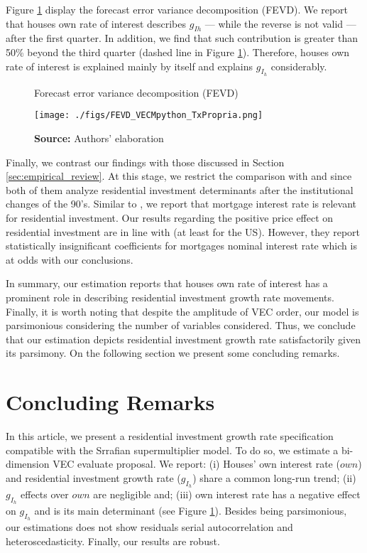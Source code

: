 \documentclass[12pt, a4paper]{article}
\begin{document}
Figure \ref{fevd} display the forecast error variance decomposition (FEVD).
We report that houses own rate of interest describes \(g_{Ih}\) --- while the reverse is not valid --- after the first quarter.
In addition, we find that such contribution is greater than 50\% beyond the third quarter (dashed line in Figure \ref{fevd}).
Therefore, houses own rate of interest is explained mainly by itself and explains \(g_{I_h}\) considerably.

\begin{figure}[H]
	\centering
	\caption{Forecast error variance decomposition (FEVD)}
	\label{fevd}
	\texttt{[image: ./figs/FEVD\_VECMpython\_TxPropria.png]}
	\caption*{\textbf{Source:} Authors' elaboration}
\end{figure}


Finally,  we contrast our findings with those discussed in Section \ref{sec:empirical_review}.
At this stage, we restrict the comparison with  \textcite{gauger_residential_2003} and \textcite{arestis_residential_2015} since both of them analyze residential investment determinants after the institutional changes of the 90's.
Similar to \textcite{gauger_residential_2003}, we report that mortgage interest rate is relevant for residential investment.
Our results regarding the positive price effect on residential investment are in line with \textcite{arestis_residential_2015} (at least for the US).
However, they report statistically insignificant coefficients for mortgages nominal interest rate which is at odds with our conclusions.

In summary, our estimation reports that houses own rate of interest has a prominent role in describing residential investment growth rate movements.
Finally, it is worth noting that despite the amplitude of VEC order, our model is parsimonious considering the number of variables considered.
Thus, we conclude that our estimation depicts residential investment growth rate satisfactorily given its parsimony.
On the following section we present some concluding remarks.

\section{Concluding Remarks}
\label{sec:org20d8a5c}
\label{sec:Conclusion}
In this article, we present a residential investment growth rate specification compatible with the Srrafian supermultiplier model.
To do so, we estimate a bi-dimension VEC evaluate \textcite{teixeira_crescimento_2015}
proposal. 
We report: 
	(i) Houses' own interest rate (\(own\)) and residential investment growth rate (\(g_{I_h}\)) share a common long-run trend;
	(ii) \(g_{I_h}\) effects over \(own\) are negligible and; 
	(iii) own interest rate has a negative effect on \(g_{I_h}\) and is its main determinant (see Figure \ref{fevd}).
Besides being parsimonious, our estimations does not show residuals serial autocorrelation and heteroscedasticity.
Finally, our results are robust.
\end{document}
